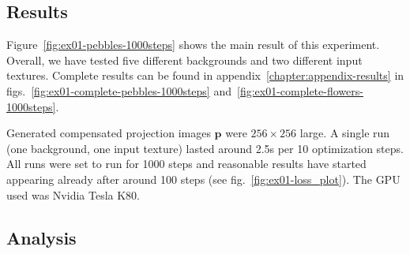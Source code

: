 \subsection{Results}
\label{section:results-experiments-01-results}

Figure~\ref{fig:ex01-pebbles-1000steps} shows the main result of this experiment. Overall, we have tested five different backgrounds and two different input textures. Complete results can be found in appendix~\ref{chapter:appendix-results} in figs.~\ref{fig:ex01-complete-pebbles-1000steps} and~\ref{fig:ex01-complete-flowers-1000steps}.

Generated compensated projection images \(\bm{p}\) were \(256 \times 256\) large. A single run (one background, one input texture) lasted around 2.5s per 10 optimization steps. All runs were set to run for 1000 steps and reasonable results have started appearing already after around 100 steps (see fig.~\ref{fig:ex01-loss_plot}). The GPU used was Nvidia Tesla K80.

\subsection{Analysis}
\label{section:results-experiments-01-analysis}

